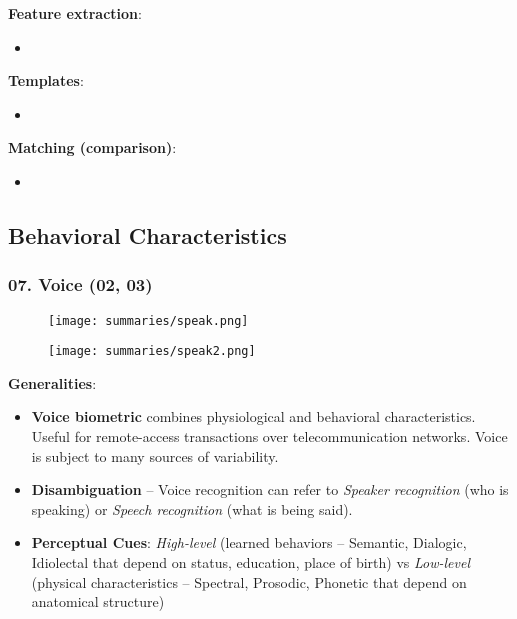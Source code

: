 \documentclass[a4paper]{article}
\begin{document}
      \textbf{Feature extraction}:
      \begin{itemize}
        \item 
      \end{itemize}

      \textbf{Templates}:
      \begin{itemize}
        \item 
      \end{itemize}

      \textbf{Matching (comparison)}:
      \begin{itemize}
        \item 
      \end{itemize}
  \newpage
  \subsection*{Behavioral Characteristics}
    \subsubsection*{07. Voice (02, 03)}
      \begin{figure}[htp]
        \centering
          \texttt{[image: summaries/speak.png]}
      \end{figure}
      \begin{figure}[htp]
        \centering
          \texttt{[image: summaries/speak2.png]}
      \end{figure}
      \textbf{Generalities}:
      \begin{itemize}
        \item \textbf{Voice biometric} combines physiological and behavioral characteristics. Useful for remote-access transactions over telecommunication networks. Voice is subject to many sources of variability.
        \item \textbf{Disambiguation} -- Voice recognition can refer to \emph{Speaker recognition} (who is speaking) or \emph{Speech recognition} (what is being said).
        \item \textbf{Perceptual Cues}: \emph{High-level} (learned behaviors -- Semantic, Dialogic, Idiolectal that depend on status, education, place of birth) vs \emph{Low-level} (physical characteristics -- Spectral, Prosodic, Phonetic that depend on anatomical structure)
      \end{itemize}
\end{document}
